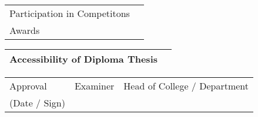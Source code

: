 \begin{tabular}{|p{\feldC}|p{\feldD}|}
 \hline
 Participation in Competitons & \\
 Awards & \\
 \hline
\end{tabular}

\begin{tabular}{|p{\feldC}|p{\feldD}|}
 \hline
 Accessibility of Diploma Thesis & \\
 \hline
\end{tabular}

\begin{tabular}{|p{\feldC}|p{\feldE}|p{\feldE}|}
 \hline
 Approval & \scriptsize{Examiner} & \scriptsize{Head of College / Department}\\ 
 (Date / Sign)& & \\
 \hline
\end{tabular}
\linespread{1.25} \normalsize
